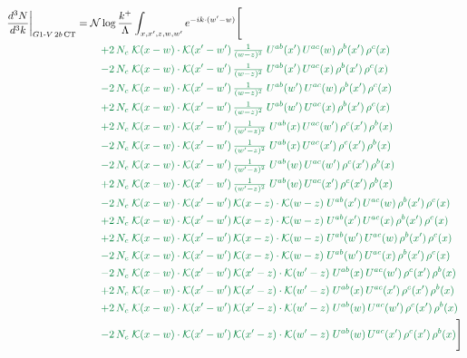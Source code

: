 \documentclass[10pt]{article}
\numberwithin{equation}{section}
\newcommand{\NN}{\mathcal N\log\frac{k^+}{\Lambda}}
\begin{document}
\begin{align}
\frac{d^3N}{d^3k}\bigg|_{G1\text{-}V\,2b\,{\rm CT}}={}&\NN\int_{x,x',z,w,w'}e^{-ik\cdot(w'-w)}\Bigg[\notag\\
&\quad{\color{JIM}+2\,N_c\;\mathcal{K}(x-w)\cdot\mathcal{K}(x'-w')\,\tfrac{1}{(w-z)^{2}}\;U^{ab}(x')\,U^{ac}(w)\,\rho^{b}(x')\,\rho^{c}(x)}\notag\\
&\quad{\color{JIM}-2\,N_c\;\mathcal{K}(x-w)\cdot\mathcal{K}(x'-w')\,\tfrac{1}{(w-z)^{2}}\;U^{ab}(x')\,U^{ac}(x)\,\rho^{b}(x')\,\rho^{c}(x)}\notag\\
&\quad{\color{JIM}-2\,N_c\;\mathcal{K}(x-w)\cdot\mathcal{K}(x'-w')\,\tfrac{1}{(w-z)^{2}}\;U^{ab}(w')\,U^{ac}(w)\,\rho^{b}(x')\,\rho^{c}(x)}\notag\\
&\quad{\color{JIM}+2\,N_c\;\mathcal{K}(x-w)\cdot\mathcal{K}(x'-w')\,\tfrac{1}{(w-z)^{2}}\;U^{ab}(w')\,U^{ac}(x)\,\rho^{b}(x')\,\rho^{c}(x)}\notag\\
&\quad{\color{JIM}+2\,N_c\;\mathcal{K}(x-w)\cdot\mathcal{K}(x'-w')\,\tfrac{1}{(w'-z)^{2}}\;U^{ab}(x)\,U^{ac}(w')\,\rho^{c}(x')\,\rho^{b}(x)}\notag\\
&\quad{\color{JIM}-2\,N_c\;\mathcal{K}(x-w)\cdot\mathcal{K}(x'-w')\,\tfrac{1}{(w'-z)^{2}}\;U^{ab}(x)\,U^{ac}(x')\,\rho^{c}(x')\,\rho^{b}(x)}\notag\\
&\quad{\color{JIM}-2\,N_c\;\mathcal{K}(x-w)\cdot\mathcal{K}(x'-w')\,\tfrac{1}{(w'-z)^{2}}\;U^{ab}(w)\,U^{ac}(w')\,\rho^{c}(x')\,\rho^{b}(x)}\notag\\
&\quad{\color{JIM}+2\,N_c\;\mathcal{K}(x-w)\cdot\mathcal{K}(x'-w')\,\tfrac{1}{(w'-z)^{2}}\;U^{ab}(w)\,U^{ac}(x')\,\rho^{c}(x')\,\rho^{b}(x)}\notag\\
&\quad{\color{JIM}-2\,N_c\;\mathcal{K}(x-w)\cdot\mathcal{K}(x'-w')\,\mathcal{K}(x-z)\cdot\mathcal{K}(w-z)\;U^{ab}(x')\,U^{ac}(w)\,\rho^{b}(x')\,\rho^{c}(x)}\notag\\
&\quad{\color{JIM}+2\,N_c\;\mathcal{K}(x-w)\cdot\mathcal{K}(x'-w')\,\mathcal{K}(x-z)\cdot\mathcal{K}(w-z)\;U^{ab}(x')\,U^{ac}(x)\,\rho^{b}(x')\,\rho^{c}(x)}\notag\\
&\quad{\color{JIM}+2\,N_c\;\mathcal{K}(x-w)\cdot\mathcal{K}(x'-w')\,\mathcal{K}(x-z)\cdot\mathcal{K}(w-z)\;U^{ab}(w')\,U^{ac}(w)\,\rho^{b}(x')\,\rho^{c}(x)}\notag\\
&\quad{\color{JIM}-2\,N_c\;\mathcal{K}(x-w)\cdot\mathcal{K}(x'-w')\,\mathcal{K}(x-z)\cdot\mathcal{K}(w-z)\;U^{ab}(w')\,U^{ac}(x)\,\rho^{b}(x')\,\rho^{c}(x)}\notag\\
&\quad{\color{JIM}-2\,N_c\;\mathcal{K}(x-w)\cdot\mathcal{K}(x'-w')\,\mathcal{K}(x'-z)\cdot\mathcal{K}(w'-z)\;U^{ab}(x)\,U^{ac}(w')\,\rho^{c}(x')\,\rho^{b}(x)}\notag\\
&\quad{\color{JIM}+2\,N_c\;\mathcal{K}(x-w)\cdot\mathcal{K}(x'-w')\,\mathcal{K}(x'-z)\cdot\mathcal{K}(w'-z)\;U^{ab}(x)\,U^{ac}(x')\,\rho^{c}(x')\,\rho^{b}(x)}\notag\\
&\quad{\color{JIM}+2\,N_c\;\mathcal{K}(x-w)\cdot\mathcal{K}(x'-w')\,\mathcal{K}(x'-z)\cdot\mathcal{K}(w'-z)\;U^{ab}(w)\,U^{ac}(w')\,\rho^{c}(x')\,\rho^{b}(x)}\notag\\
&\quad{\color{JIM}-2\,N_c\;\mathcal{K}(x-w)\cdot\mathcal{K}(x'-w')\,\mathcal{K}(x'-z)\cdot\mathcal{K}(w'-z)\;U^{ab}(w)\,U^{ac}(x')\,\rho^{c}(x')\,\rho^{b}(x)}\Bigg]\label{eq:gen4}
\end{align}
\end{document}
